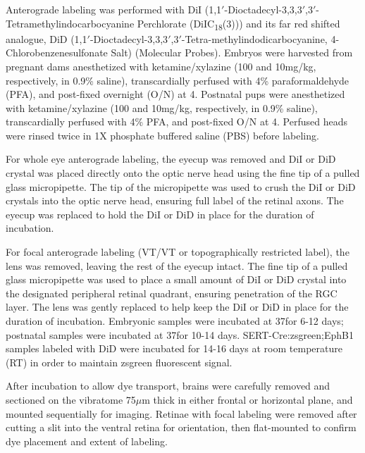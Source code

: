 Anterograde labeling was performed with DiI (1,1$'$-Dioctadecyl-3,3,3$'$,3$'$-Tetramethylindocarbocyanine Perchlorate (DiIC\textsubscript{18}(3))) and its far red shifted analogue, DiD (1,1$'$-Dioctadecyl-3,3,3$'$,3$'$-Tetra-methylindodicarbocyanine, 4-Chlorobenzenesulfonate Salt) (Molecular Probes).
Embryos were harvested from pregnant dams anesthetized with ketamine/xylazine (100 and 10mg/kg, respectively, in 0.9\% saline), transcardially perfused with 4\% paraformaldehyde (PFA), and post-fixed overnight (O/N) at 4\textcelsius.
Postnatal pups were anesthetized with ketamine/xylazine (100 and 10mg/kg, respectively, in 0.9\% saline), transcardially perfused with 4\% PFA, and post-fixed O/N at 4\textcelsius.
Perfused heads were rinsed twice in 1X phosphate buffered saline (PBS) before labeling.

For whole eye anterograde labeling, the eyecup was removed and DiI or DiD crystal was placed directly onto the optic nerve head using the fine tip of a pulled glass micropipette.
The tip of the micropipette was used to crush the DiI or DiD crystals into the optic nerve head, ensuring full label of the retinal axons.
The eyecup was replaced to hold the DiI or DiD in place for the duration of incubation.

For focal anterograde labeling (VT/VT or topographically restricted label), the lens was removed, leaving the rest of the eyecup intact.
The fine tip of a pulled glass micropipette was used to place a small amount of DiI or DiD crystal into the designated peripheral retinal quadrant, ensuring penetration of the RGC layer.
The lens was gently replaced to help keep the DiI or DiD in place for the duration of incubation.
Embryonic samples were incubated at 37\textcelsius for 6-12 days; postnatal samples were incubated at 37\textcelsius for 10-14 days.
SERT-Cre:zsgreen;EphB1 samples labeled with DiD were incubated for 14-16 days at room temperature (RT) in order to maintain zsgreen fluorescent signal.

After incubation to allow dye transport, brains were carefully removed and sectioned on the vibratome 75$\mu$m thick in either frontal or horizontal plane, and mounted sequentially for imaging.
Retinae with focal labeling were removed after cutting a slit into the ventral retina for orientation, then flat-mounted to confirm dye placement and extent of labeling.